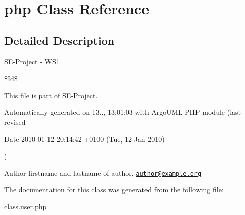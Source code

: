 \hypertarget{class_1_1user_1_1php}{\section{php Class Reference}
\label{class_1_1user_1_1php}
}


\subsection{Detailed Description}
S\+E-\/\+Project -\/ \hyperlink{namespace_w_s1}{W\+S1}

\$\+Id\$

This file is part of S\+E-\/\+Project.

Automatically generated on 13.., 13\+:01\+:03 with Argo\+U\+M\+L P\+H\+P module (last revised \begin{DoxyParagraph}{Date}
2010-\/01-\/12 20\+:14\+:42 +0100 (Tue, 12 Jan 2010) 
\end{DoxyParagraph}
)

\begin{DoxyAuthor}{Author}
firstname and lastname of author, \href{mailto:author@example.org}{\tt author@example.\+org} 
\end{DoxyAuthor}


The documentation for this class was generated from the following file\+:\begin{DoxyCompactItemize}
\item 
class.\+user.\+php\end{DoxyCompactItemize}
